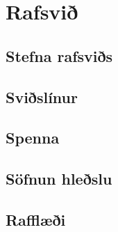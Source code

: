 \chapter{Rafsvið}

\section{Stefna rafsviðs}

\section{Sviðslínur}

\section{Spenna}

\section{Söfnun hleðslu}

\section{Rafflæði}

